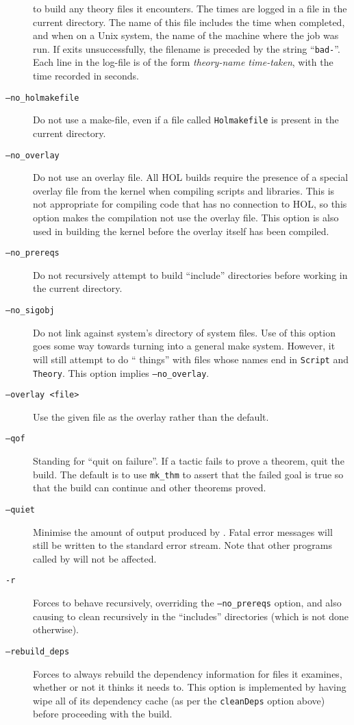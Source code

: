 \begin{description}
  to build any theory files it encounters.  The times are logged in a
  file in the current directory.  The name of this file includes the
  time when \holmake{} completed, and when on a Unix system, the name
  of the machine where the job was run.  If \holmake{} exits
  unsuccessfully, the filename is preceded by the string
  ``\texttt{bad-}''. Each line in the log-file is of the form
  \textit{theory-name time-taken}, with the time recorded in seconds.
\item[\texttt{--no\_holmakefile}]  Do not use a make-file, even if a file
  called \texttt{Holmakefile} is present in the current directory.
\item[\texttt{--no\_overlay}] Do not use an overlay file.  All HOL
  builds require the presence of a special overlay file from the
  kernel when compiling scripts and libraries.  This is not
  appropriate for compiling code that has no connection to HOL, so
  this option makes the compilation not use the overlay file.  This
  option is also used in building the kernel before the overlay itself
  has been compiled.
\item[\texttt{--no\_prereqs}]%
%
Do not recursively attempt to build ``include'' directories before working in the current directory.
\item[\texttt{--no\_sigobj}]
  Do not link against \HOL{} system's directory of \HOL{} system files.
  Use of this option goes some way towards turning \holmake{} into a general \ML{} \textsf{make} system.
  However, it will still attempt to do ``\HOL{} things'' with files whose names end in \texttt{Script} and \texttt{Theory}.
  This option implies \texttt{--no\_overlay}.
\item[\texttt{--overlay <file>}] Use the given file as the overlay
  rather than the default.
\item[\texttt{--qof}] Standing for ``quit on failure''.  If a tactic
  fails to prove a theorem, quit the build.  The default is to use
  \texttt{mk\_thm} to assert that the failed goal is true so that the
  build can continue and other theorems proved.
\item[\texttt{--quiet}] Minimise the amount of output produced by
  \holmake{}.  Fatal error messages will still be written to the
  standard error stream.  Note that other programs called by \holmake{} will not
  be affected.
\item[\texttt{-r}]%
%
Forces \holmake{} to behave recursively, overriding the \texttt{--no\_prereqs} option, and also causing \holmake{} to clean recursively in the ``includes'' directories (which is not done otherwise).
\item[{\tt --rebuild\_deps}] Forces \holmake{} to always
  rebuild the dependency information for files it examines, whether or
  not it thinks it needs to.  This option is implemented by having
  \holmake{} wipe all of its dependency cache (as per the
  \texttt{cleanDeps} option above) before proceeding with the build.
\end{description}

